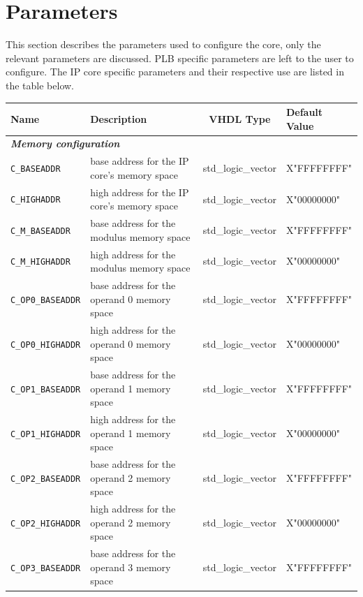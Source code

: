 \section{Parameters}
This section describes the parameters used to configure the core, only the relevant parameters are discussed. PLB
specific parameters are left to the user to configure. The IP core specific parameters and their respective use are
listed in the table below.
\begin{center}
	\begin{tabular}{|l|p{6.5cm}|c|l|}
		\hline
		\rowcolor{Gray}
		\textbf{Name} & \textbf{Description} & \textbf{VHDL Type} &\textbf{Default Value} \bigstrut\\
		\hline
		\multicolumn{4}{|l|}{\textit{\textbf{Memory configuration}}} \\
		\hline
		\verb|C_BASEADDR| & base address for the IP core's memory space & std\_logic\_vector & X"FFFFFFFF" \bigstrut\\
		\hline
		\verb|C_HIGHADDR| & high address for the IP core's memory space & std\_logic\_vector & X"00000000" \bigstrut\\
		\hline
		\verb|C_M_BASEADDR| & base address for the modulus memory space & std\_logic\_vector & X"FFFFFFFF" \bigstrut\\
		\hline
		\verb|C_M_HIGHADDR| & high address for the modulus memory space & std\_logic\_vector & X"00000000" \bigstrut\\
		\hline
		\verb|C_OP0_BASEADDR| & base address for the operand 0 memory space & std\_logic\_vector & X"FFFFFFFF" \bigstrut\\
		\hline
		\verb|C_OP0_HIGHADDR| & high address for the operand 0 memory space & std\_logic\_vector & X"00000000" \bigstrut\\
		\hline
		\verb|C_OP1_BASEADDR| & base address for the operand 1 memory space & std\_logic\_vector & X"FFFFFFFF" \bigstrut\\
		\hline
		\verb|C_OP1_HIGHADDR| & high address for the operand 1 memory space & std\_logic\_vector & X"00000000" \bigstrut\\
		\hline
		\verb|C_OP2_BASEADDR| & base address for the operand 2 memory space & std\_logic\_vector & X"FFFFFFFF" \bigstrut\\
		\hline
		\verb|C_OP2_HIGHADDR| & high address for the operand 2 memory space & std\_logic\_vector & X"00000000" \bigstrut\\
		\hline
		\verb|C_OP3_BASEADDR| & base address for the operand 3 memory space & std\_logic\_vector & X"FFFFFFFF" \bigstrut\\

\end{tabular}
\end{center}
